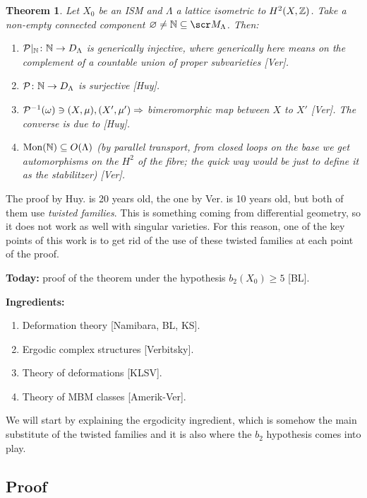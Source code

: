 \documentclass[A4paper, british]{amsart}
\theoremstyle{darkgreentheorem}
\newtheorem{thm}{Theorem}[section]
\theoremstyle{darkbluedefinition}
\theoremstyle{darkredexample}
\theoremstyle{remark}
\newcommand{\1}{\mathbbm{1}}
\newcommand{\sub}{\subseteq}
\begin{document}
\begin{thm}
    Let $X_{0}$ be an ISM and $\Lambda$ a lattice isometric to $H^{2}(X,\mathbb{Z})$.
    Take a non-empty connected component $\varnothing \neq \N\sub \M_{\Lambda}$.
    Then:
    \begin{enumerate}
	\item $\mathcal{P}|_{\mathbb{N}}\colon \mathbb{N}\to D_{\Lambda}$ is \textit{generically} injective, where generically here means on the complement of a countable union of proper subvarieties [Ver].
	\item $\mathcal{P}\colon \mathbb{N}\to D_{\Lambda}$ is surjective [Huy].
	\item $\mathcal{P}^{-1}(\omega)\ni (X,\mu),(X',\mu') \Rightarrow $ bimeromorphic map between $X$ to $X'$ [Ver].
	    The converse is due to [Huy].
	\item $\operatorname{Mon}(\N)\sub O(\Lambda)$ (by parallel transport, from closed loops on the base we get automorphisms on the $H^{2}$ of the fibre; the quick way would be just to define it as the stabilitzer) [Ver].
    \end{enumerate}
\end{thm}

The proof by Huy. is 20 years old, the one by Ver. is 10 years old, but both of them use \textit{twisted families}.
This is something coming from differential geometry, so it does not work as well with singular varieties.
For this reason, one of the key points of this work is to get rid of the use of these twisted families at each point of the proof.

\textbf{Today:} proof of the theorem under the hypothesis $b_{2}(X_{0})\geqslant 5$ [BL].

\textbf{Ingredients:}
\begin{enumerate}
    \item Deformation theory [Namibara, BL, KS].
    \item Ergodic complex structures [Verbitsky].
    \item Theory of deformations [KLSV].
    \item Theory of MBM classes [Amerik-Ver].
\end{enumerate}

We will start by explaining the ergodicity ingredient, which is somehow the main substitute of the twisted families and it is also where the $b_{2}$ hypothesis comes into play.

\subsection{Proof}
\end{document}
